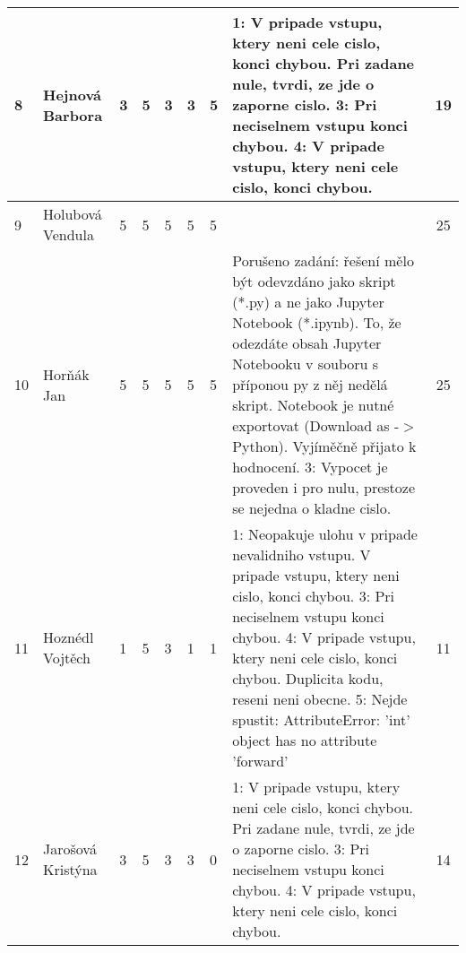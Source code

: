 \documentclass[landscape, 12pt]{article}
\begin{document}
\begin{longtable}{|l l | C{0.7cm} | C{0.7cm} | C{0.7cm} | C{0.7cm} | C{0.7cm} | L{15cm} |c|}
8 & Hejnová Barbora    &       3 &       5 &       3 &       3 &       5 & 1: V pripade vstupu, ktery neni cele cislo, konci chybou. Pri zadane nule, tvrdi, ze jde o zaporne cislo. 3: Pri neciselnem vstupu konci chybou.  4: V pripade vstupu, ktery neni cele cislo, konci chybou.                                                                                                                                                                                         &       19 \\
\hline

  9 & Holubová Vendula   &       5 &       5 &       5 &       5 &       5 &                                                                                                                                                                                                                                                                                                                                                                                      &       25 \\
\hline

  10 & Horňák Jan         &      5 &       5 &       5 &       5 &       5 & Porušeno zadání: řešení mělo být odevzdáno jako skript (*.py) a ne jako Jupyter Notebook (*.ipynb). To, že odezdáte obsah Jupyter Notebooku v souboru s příponou py z něj nedělá skript. Notebook je nutné exportovat (Download as -\ensuremath{>} Python). Vyjíměčně přijato k hodnocení. 3: Vypocet je proveden i pro nulu, prestoze se nejedna o kladne cislo. &       25 \\
\hline

  11 & Hoznédl Vojtěch    &       1 &       5 &       3 &       1 &       1 & 1: Neopakuje ulohu v pripade nevalidniho vstupu. V pripade vstupu, ktery neni cislo, konci chybou. 3: Pri neciselnem vstupu konci chybou. 4: V pripade vstupu, ktery neni cele cislo, konci chybou. Duplicita kodu, reseni neni obecne. 5: Nejde spustit: AttributeError: 'int' object has no attribute 'forward'                                                                                   &       11 \\
\hline

  12 & Jarošová Kristýna  &       3 &       5 &       3 &       3 &       0 & 1: V pripade vstupu, ktery neni cele cislo, konci chybou. Pri zadane nule, tvrdi, ze jde o zaporne cislo. 3: Pri neciselnem vstupu konci chybou. 4: V pripade vstupu, ktery neni cele cislo, konci chybou.                                                                                                                                                                                          &       14 \\
\hline


\end{longtable}
\end{document}
